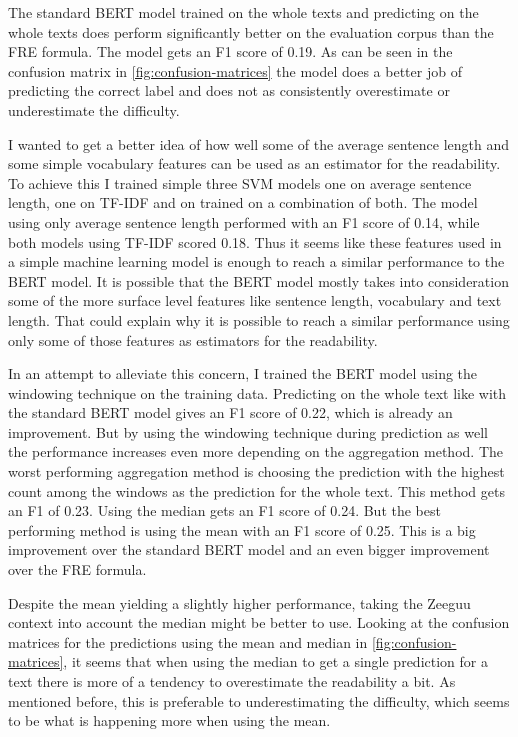 \documentclass[11pt,a4paper]{article}
\begin{document}
The standard BERT model trained on the whole texts and predicting on the whole
texts does perform significantly better on the evaluation corpus than the FRE
formula. The model gets an F1 score of 0.19. As can be seen in the confusion
matrix in \autoref{fig:confusion-matrices} the model does a better job of
predicting the correct label and does not as consistently overestimate or
underestimate the difficulty.

I wanted to get a better idea of how well some of the average sentence length
and some simple vocabulary features can be used as an estimator for the
readability. To achieve this I trained simple three SVM models one on average sentence
length, one on TF-IDF and on trained on a combination of both. The model using
only average sentence length performed with an F1 score of 0.14, while both
models using TF-IDF scored 0.18. Thus it seems like these features used in a
simple machine learning model is enough to reach a similar performance to the
BERT model. It is possible that the BERT model mostly takes into consideration
some of the more surface level features like sentence length, vocabulary and
text length. That could explain why it is possible to reach a similar
performance using only some of those features as estimators for the
readability.

In an attempt to alleviate this concern, I trained the BERT model using the
windowing technique on the training data. Predicting on the whole text like
with the standard BERT model gives an F1 score of 0.22, which is already an
improvement. But by using the windowing technique during prediction as well the
performance increases even more depending on the aggregation method. The worst
performing aggregation method is choosing the prediction with the highest
count among the windows as the prediction for the whole text. This method gets
an F1 of 0.23. Using the median gets an F1 score of 0.24.
But the best performing method is using the mean with an F1 score of 0.25. This
is a big improvement over the standard BERT model and an even bigger
improvement over the FRE formula.

Despite the mean yielding a slightly higher performance, taking the Zeeguu
context into account the median might be better to use. Looking at the
confusion matrices for the predictions using the mean and median in
\autoref{fig:confusion-matrices}, it seems that when using the median to
get a single prediction for a text there is more of a tendency to overestimate
the readability a bit. As mentioned before, this is preferable to
underestimating the difficulty, which seems to be what is happening more when
using the mean.
\end{document}
